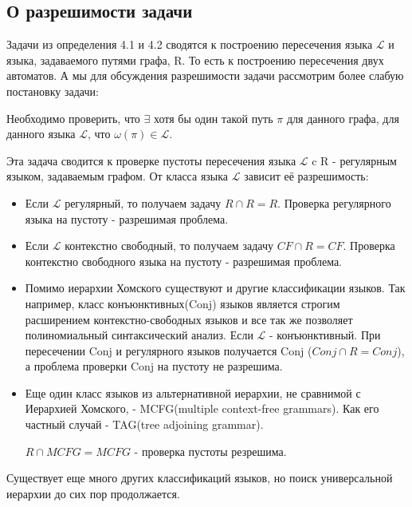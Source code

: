 \subsection{О разрешимости задачи}

Задачи из определения 4.1 и 4.2 сводятся к построению пересечения языка $\mathcal{L}$ и языка, задаваемого путями графа, R. То есть к построению пересечения двух автоматов. 
А мы для обсуждения разрешимости задачи рассмотрим более слабую постановку задачи:

\begin{definition}
	Необходимо проверить, что $\exists$ хотя бы один такой путь $\pi$ для данного графа, для данного языка $\mathcal{L}$, что $\omega(\pi) \in \mathcal{L}$.
	
\end{definition}

Эта задача сводится к проверке пустоты пересечения языка $\mathcal{L}$ c R - регулярным языком, задаваемым графом. От класса языка $\mathcal{L}$ зависит её разрешимость:

\begin{itemize}
	\item Если $\mathcal{L}$ регулярный, то получаем задачу $R \cap R = R$.
	Проверка регулярного языка на пустоту - разрешимая проблема.
	
	\item Если $\mathcal{L}$ контекстно свободный, то получаем задачу $CF \cap R = CF$.
	Проверка контекстно свободного языка на пустоту - разрешимая проблема.
	
	\item Помимо иерархии Хомского существуют и другие классификации языков.
	Так например, класс конъюнктивных(Conj) языков является строгим расширением контекстно-свободных языков и все так же позволяет полиномиальный синтаксический анализ.
	Если $\mathcal{L}$ - конъюнктивный. При пересечении Conj и регулярного языков получается Conj ($Conj \cap R = Conj$), а проблема проверки Conj на пустоту не разрешима.
	
	\item Еще один класс языков из альтернативной иерархии, не сравнимой с Иерархией Хомского, - MCFG(multiple context-free grammars). Как его частный случай - TAG(tree adjoining grammar).
	
	$R \cap MCFG = MCFG$ - проверка пустоты резрешима.
	
\end{itemize}

Существует еще много других классификаций языков, но поиск универсальной иерархии до сих пор продолжается.

